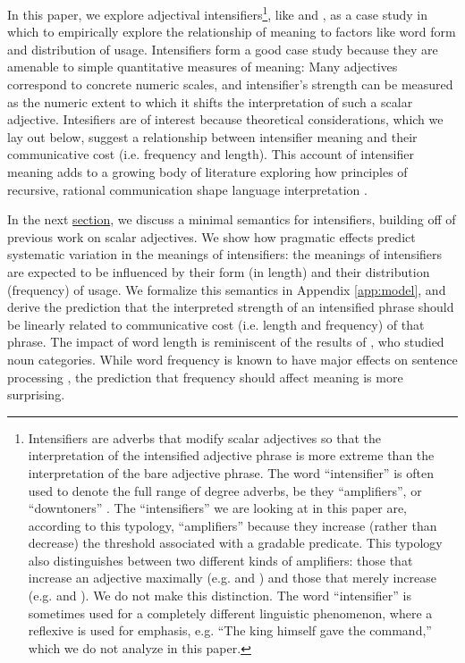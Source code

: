 In this paper, we explore adjectival intensifiers\footnote{
Intensifiers are adverbs that modify scalar adjectives so that the interpretation of the intensified adjective phrase is more extreme than the interpretation of the bare adjective phrase.
The word ``intensifier'' is often used to denote the full range of degree adverbs, be they ``amplifiers'', or ``downtoners'' \cite{quirk_comprehensive_1985}.
The ``intensifiers'' we are looking at in this paper are, according to this typology, ``amplifiers'' because they increase (rather than decrease) the threshold associated with a gradable predicate.
This typology also distinguishes between two different kinds of amplifiers: those that increase an adjective maximally (e.g.  and ) and those that merely increase (e.g.  and ).
We do not make this distinction.
The word ``intensifier'' is sometimes used for a completely different linguistic phenomenon, where a reflexive is used for emphasis, e.g. ``The king himself gave the command,'' which we do not analyze in this paper. 
},
like  and , as a case study in which to empirically explore the relationship of meaning to factors like word form and distribution of usage.
Intensifiers form a good case study because they are amenable to simple quantitative measures of meaning: Many adjectives correspond to concrete numeric scales, and intensifier's strength can be measured as the numeric extent to which it shifts the interpretation of such a scalar adjective. Intesifiers are of interest because theoretical considerations, which we lay out below, suggest a relationship between intensifier meaning and their communicative cost (i.e. frequency and length).
This account of intensifier meaning adds to a growing body of literature exploring how principles of recursive, rational communication shape language interpretation \citep[e.g.][]{grice_logic_1975, frank_predicting_2012, goodman_knowledge_2013, franke_quantity_2011, russell_probabilistic_2012, kao_nonliteral_2014, bergen_pragmatic_2014}.

In the next \hyperref[sec:semantics]{section}, we discuss a minimal semantics for intensifiers, building off of previous work on scalar adjectives.
We show how pragmatic effects predict systematic variation in the meanings of intensifiers: the meanings of intensifiers are expected to be influenced by their form (in length) and their distribution (frequency) of usage.
We formalize this semantics in Appendix \ref{app:model}, and derive the prediction that the interpreted strength of an intensified phrase should be linearly related to communicative cost (i.e. length and frequency) of that phrase.
The impact of word length is reminiscent of the results of \citet{lewis_conceptual_2016}, who studied noun categories.
While word frequency is known to have major effects on sentence processing \citep[e.g.][]{levy_expectation-based_2008}, the prediction that frequency should affect meaning is more surprising.

